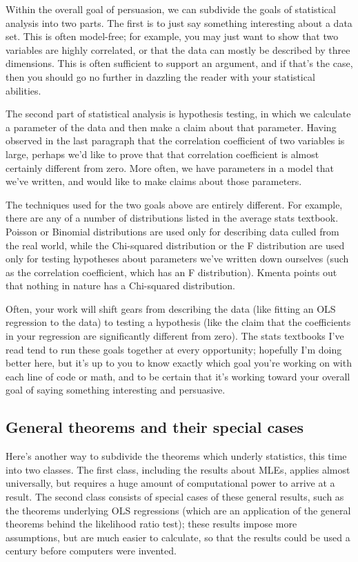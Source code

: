 \documentclass[12pt,notitlepage, openany]{book}
\begin{document}
Within the overall goal of persuasion, we can subdivide the goals of
statistical analysis into two parts. The first is to just say something
interesting about a data set. This is often model-free; for example,
you may just want to show that two variables are highly correlated, or
that the data can mostly be described by three dimensions. This is often
sufficient to support an argument, and if that's the case, then you should
go no further in dazzling the reader with your statistical abilities.

The second part of statistical analysis is hypothesis testing, in which
we calculate a parameter of the data and then make a claim about that
parameter.  Having observed in the last paragraph that the correlation
coefficient of two variables is large, perhaps we'd like to prove
that that correlation coefficient is almost certainly different from
zero. More often, we have parameters in a model that we've written,
and would like to make claims about those parameters.

The techniques used for the two goals above are entirely different. For
example, there are any of a number of distributions listed in the
average stats textbook.  Poisson or Binomial distributions are used
only for describing data culled from the real world, while the Chi-squared
distribution or the F distribution are used only for testing hypotheses
about parameters we've written down ourselves (such as the correlation
coefficient, which has an F distribution). Kmenta points out that nothing
in nature has a Chi-squared distribution. 

Often, your work will shift
gears from describing the data (like fitting an OLS regression to the
data) to testing a hypothesis (like the claim that the coefficients
in your regression are significantly different from zero). The stats
textbooks I've read tend to run these goals together at every opportunity;
hopefully I'm doing better here, but it's up to you to know exactly
which goal you're working on with each line of code or math, and to be
certain that it's working toward your overall goal of saying something
interesting and persuasive.

\subsection{General theorems and their special cases}
Here's another way to subdivide the theorems which underly
statistics, this time into two classes. The first class, including the
results about MLEs, applies almost universally, but requires a huge
amount of computational power to arrive at a result. The second class
consists of special cases of these general results, such as the theorems
underlying OLS regressions (which are an application of the general
theorems behind the likelihood ratio test); these results impose more
assumptions, but are much easier to calculate, so that the results could
be used a century before computers were invented.
\end{document}
